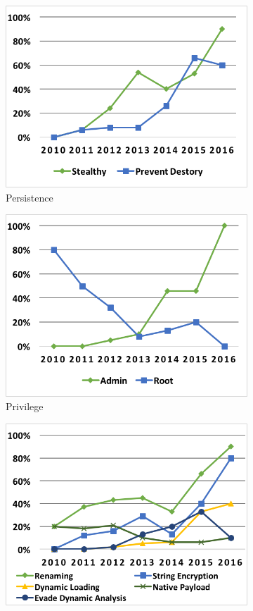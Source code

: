 \begin{figure}[t!]
\begin{subfigure}[b]{.32\textwidth}
  \centering
  \includegraphics[width=0.9\linewidth]{fig/charts/per.png}
  \caption{Persistence}
  \label{fig:sub:per}
\end{subfigure}
\begin{subfigure}[b]{.32\textwidth}
  \centering
  \includegraphics[width=0.9\linewidth]{fig/charts/pri.png}
  \caption{Privilege}
  \label{fig:sub:pri}
\end{subfigure}%
\begin{subfigure}[b]{.32\textwidth}
  \centering
  \includegraphics[width=0.9\linewidth]{fig/charts/anti.png}

\end{subfigure}
\end{figure}
